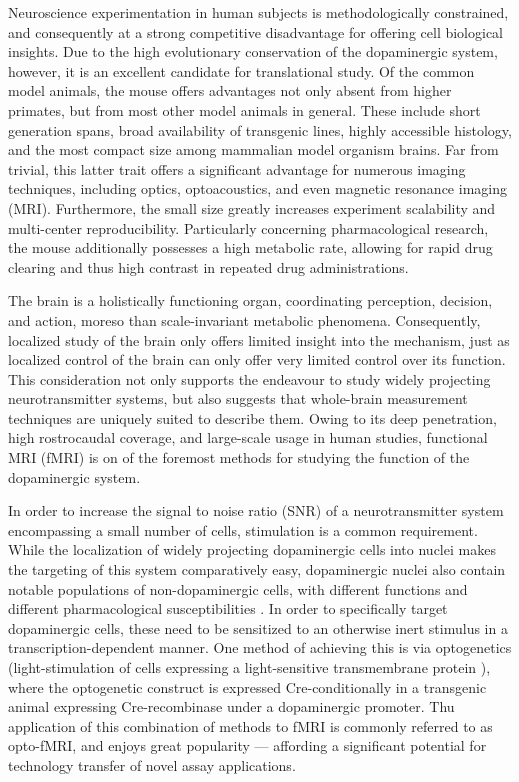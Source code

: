 Neuroscience experimentation in human subjects is methodologically constrained, and consequently at a strong competitive disadvantage for offering cell biological insights.
Due to the high evolutionary conservation of the dopaminergic system, however, it is an excellent candidate for translational study.
Of the common model animals, the mouse offers advantages not only absent from higher primates, but from most other model animals in general.
These include short generation spans, broad availability of transgenic lines, highly accessible histology, and the most compact size among mammalian model organism brains.
Far from trivial, this latter trait offers a significant advantage for numerous imaging techniques, including optics, optoacoustics, and even magnetic resonance imaging (MRI).
Furthermore, the small size greatly increases experiment scalability and multi-center reproducibility.
Particularly concerning pharmacological research, the mouse additionally possesses a high metabolic rate, allowing for rapid drug clearing and thus high contrast in repeated drug administrations.

The brain is a holistically functioning organ, coordinating perception, decision, and action, moreso than scale-invariant metabolic phenomena.
Consequently, localized study of the brain only offers limited insight into the mechanism, just as localized control of the brain can only offer very limited control over its function.
This consideration not only supports the endeavour to study widely projecting neurotransmitter systems, but also suggests that whole-brain measurement techniques are uniquely suited to describe them.
Owing to its deep penetration, high rostrocaudal coverage, and large-scale usage in human studies, functional MRI (fMRI) is on of the foremost methods for studying the function of the dopaminergic system.

In order to increase the signal to noise ratio (SNR) of a neurotransmitter system encompassing a small number of cells, stimulation is a common requirement.
While the localization of widely projecting dopaminergic cells into nuclei makes the targeting of this system comparatively easy, dopaminergic nuclei also contain notable populations of non-dopaminergic cells, with different functions and different pharmacological susceptibilities \cite{Taylor2014}.
In order to specifically target dopaminergic cells, these need to be sensitized to an otherwise inert stimulus in a transcription-dependent manner.
One method of achieving this is via optogenetics (light-stimulation of cells expressing a light-sensitive transmembrane protein \cite{Boyden2005}), where the optogenetic construct is expressed Cre-conditionally \cite{Orban1992} in a transgenic animal expressing Cre-recombinase under a dopaminergic promoter.
Thu application of this combination of methods to fMRI is commonly referred to as opto-fMRI, and enjoys great popularity \cite{Desai2011,Grandjean2019} --- affording a significant potential for technology transfer of novel assay applications.


